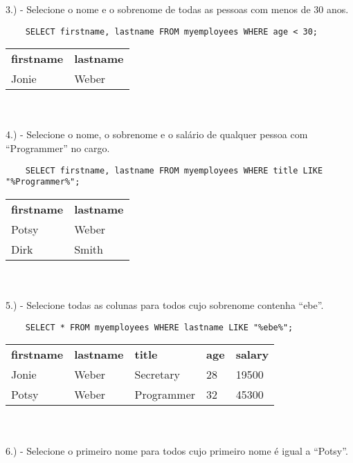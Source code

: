 3.) - Selecione o nome e o sobrenome de todas as pessoas com menos de 30 anos.

\begin{lstlisting}
    SELECT firstname, lastname FROM myemployees WHERE age < 30;
\end{lstlisting}

\begin{tabular}{l l}
    {\textbf{firstname}} & {\textbf{lastname}} \\
    {Jonie}              & {Weber}
\end{tabular} \\ \\

4.) - Selecione o nome, o sobrenome e o salário de qualquer pessoa com “Programmer” no cargo.

\begin{lstlisting}
    SELECT firstname, lastname FROM myemployees WHERE title LIKE "%Programmer%";
\end{lstlisting}

\begin{tabular}{l l}
    {\textbf{firstname}} & {\textbf{lastname}} \\
    {Potsy}              & {Weber}             \\
    {Dirk}               & {Smith}             
\end{tabular} \\ \\

5.) - Selecione todas as colunas para todos cujo sobrenome contenha “ebe”.

\begin{lstlisting}
    SELECT * FROM myemployees WHERE lastname LIKE "%ebe%";
\end{lstlisting}

\begin{tabular}{l l l l l}
    {\textbf{firstname}} & {\textbf{lastname}} & {\textbf{title}} & {\textbf{age}} & {\textbf{salary}} \\
    {Jonie}              & {Weber}             & {Secretary}      & {28}           & {19500}           \\
    {Potsy}              & {Weber}             & {Programmer}     & {32}           & {45300}
\end{tabular} \\ \\

6.) - Selecione o primeiro nome para todos cujo primeiro nome é igual a “Potsy”.


